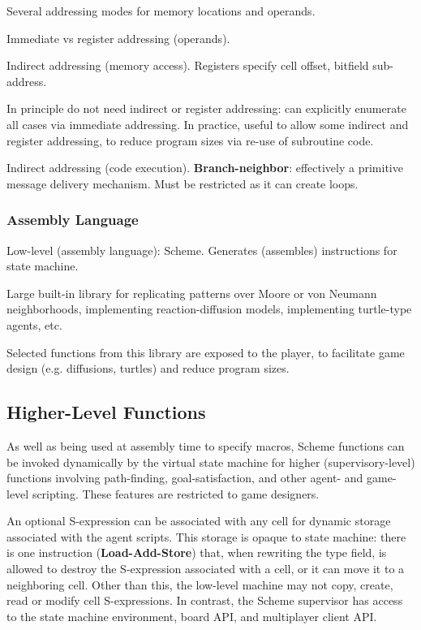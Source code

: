 \documentclass{acm_proc_article-sp}
\begin{document}
Several addressing modes for memory locations and operands.

Immediate vs register addressing (operands).

Indirect addressing (memory access). Registers specify cell offset, bitfield sub-address.

In principle do not need indirect or register addressing: can explicitly enumerate all cases via immediate addressing.
In practice, useful to allow some indirect and register addressing, to reduce program sizes via re-use of subroutine code.

Indirect addressing (code execution).
{\bf Branch-neighbor}: effectively a primitive message delivery mechanism.
Must be restricted as it can create loops.

\subsubsection{Assembly Language}

Low-level (assembly language):
Scheme. Generates (assembles) instructions for state machine.

Large built-in library for replicating patterns over Moore or von Neumann neighborhoods,
implementing reaction-diffusion models, implementing turtle-type agents, etc.

Selected functions from this library are exposed to the player,
to facilitate game design (e.g. diffusions, turtles) and reduce program sizes.

\subsection{Higher-Level Functions}

As well as being used at assembly time to specify macros,
Scheme functions can be invoked dynamically by the virtual state machine for higher (supervisory-level) functions involving path-finding, goal-satisfaction, and other agent- and game-level scripting.
These features are restricted to game designers.

An optional S-expression can be associated with any cell for dynamic storage associated with the agent scripts.
This storage is opaque to state machine: there is one instruction ({\bf Load-Add-Store}) that, when rewriting the type field, is allowed to destroy the S-expression associated with a cell, or it can move it to a neighboring cell.
Other than this, the low-level machine may not copy, create, read or modify cell S-expressions.
In contrast, the Scheme supervisor has access to the state machine environment, board API, and multiplayer client API.
\end{document}
